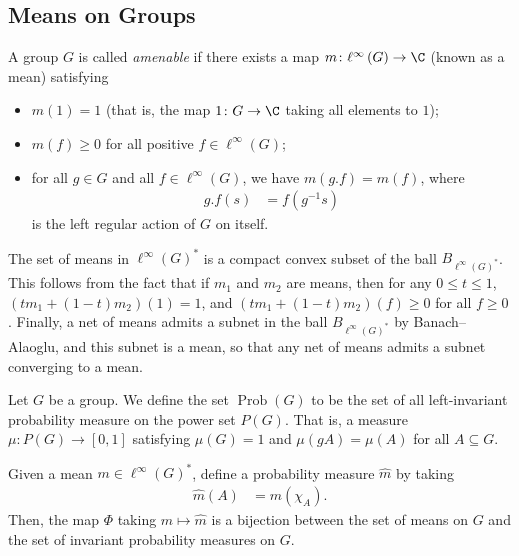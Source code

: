 \documentclass[10pt]{mypackage}
\begin{document}
\subsection{Means on Groups}%
\begin{definition}
  A group $G$ is called \textit{amenable} if there exists a map $m\colon \ell^{\infty}\left( G \right)\rightarrow \C$ (known as a mean) satisfying
  \begin{itemize}
    \item $m(1) = 1$ (that is, the map $1\colon G\rightarrow \C$ taking all elements to $1$);
    \item $m\left( f \right) \geq 0$ for all positive $f\in \ell^{\infty}\left( G \right)$;
    \item for all $g\in G$ and all $f\in \ell^{\infty}\left( G \right)$, we have $m\left( g.f \right) = m(f)$, where
      \begin{align*}
        g.f(s) &= f\left( g^{-1}s \right)
      \end{align*}
      is the left regular action of $G$ on itself.
  \end{itemize}
\end{definition}
The set of means in $\ell^{\infty}\left( G \right)^{\ast}$ is a compact convex subset of the ball $B_{\ell^{\infty}(G)^{\ast}}$. This follows from the fact that if $m_1$ and $m_2$ are means, then for any $0\leq t \leq 1$, $\left( tm_1 + \left( 1-t \right)m_2 \right)\left( 1 \right) = 1$, and $\left( tm_1 + \left( 1-t \right)m_2 \right)\left( f \right) \geq 0$ for all $f\geq 0$. Finally, a net of means admits a subnet in the ball $B_{\ell^{\infty}(G)^{\ast}}$ by Banach--Alaoglu, and this subnet is a mean, so that any net of means admits a subnet converging to a mean.
\begin{definition}
  Let $G$ be a group. We define the set $\operatorname{Prob}(G)$ to be the set of all left-invariant probability measure on the power set $P(G)$. That is, a measure $\mu\colon P(G)\rightarrow [0,1]$ satisfying $\mu\left( G \right) = 1$ and $\mu\left( gA \right) = \mu\left( A \right)$ for all $A\subseteq G$.
\end{definition}
\begin{proposition}
  Given a mean $m\in \ell^{\infty}\left( G \right)^{\ast}$, define a probability measure $\hat{m}$ by taking
  \begin{align*}
    \hat{m}\left( A \right) &= m\left( \chi_A \right).
  \end{align*}
  Then, the map $\Phi$ taking $m\mapsto \hat{m}$ is a bijection between the set of means on $G$ and the set of invariant probability measures on $G$.
\end{proposition}
\end{document}
